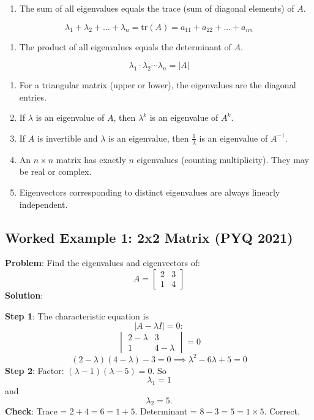 \documentclass[
]{article}
\providecommand{\tightlist}{%
  \setlength{\itemsep}{0pt}\setlength{\parskip}{0pt}}
\begin{document}
\begin{enumerate}
\def\labelenumi{\arabic{enumi}.}
\tightlist
\item
  The sum of all eigenvalues equals the trace (sum of diagonal elements)
  of \(A\).
\end{enumerate}
\[
\lambda_1 + \lambda_2 + \dots + \lambda_n = \text{tr}(A) = a_{11} + a_{22} + \dots + a_{nn}
\]
\begin{enumerate}
\def\labelenumi{\arabic{enumi}.}
\setcounter{enumi}{1}
\tightlist
\item
  The product of all eigenvalues equals the determinant of \(A\).
\end{enumerate}
\[
\lambda_1 \cdot \lambda_2 \cdots \lambda_n = |A|
\]
\begin{enumerate}
\def\labelenumi{\arabic{enumi}.}
\setcounter{enumi}{2}
\item
  For a triangular matrix (upper or lower), the eigenvalues are the
  diagonal entries.
\item
  If \(\lambda\) is an eigenvalue of \(A\), then \(\lambda^k\) is an
  eigenvalue of \(A^k\).
\item
  If \(A\) is invertible and \(\lambda\) is an eigenvalue, then
  \(\frac{1}{\lambda}\) is an eigenvalue of \(A^{-1}\).
\item
  An \(n \times n\) matrix has exactly \(n\) eigenvalues (counting
  multiplicity). They may be real or complex.
\item
  Eigenvectors corresponding to distinct eigenvalues are always linearly
  independent.
\end{enumerate}

\subsection{Worked Example 1: 2x2 Matrix (PYQ
2021)}\label{worked-example-1-2x2-matrix-pyq-2021}

\textbf{Problem}: Find the eigenvalues and eigenvectors of:
\[
A =
\begin{bmatrix}
2 & 3 \\
1 & 4
\end{bmatrix}
\]
\textbf{Solution}:

\textbf{Step 1}: The characteristic equation is
\[
\lvert A - \lambda I \rvert = 0:
\]
\[
\begin{vmatrix}
2 - \lambda & 3 \\
1 & 4 - \lambda
\end{vmatrix} = 0
\]
\[
(2 - \lambda)(4 - \lambda) - 3 = 0 \implies \lambda^2 - 6\lambda + 5 = 0
\]
\textbf{Step 2}: Factor: \((\lambda - 1)(\lambda - 5) = 0\). So
\[
\lambda_1 = 1
\]
and
\[
\lambda_2 = 5.
\]
\textbf{Check}: Trace = \(2 + 4 = 6 = 1 + 5\). Determinant =
\(8 - 3 = 5 = 1 \times 5\). Correct.
\end{document}
